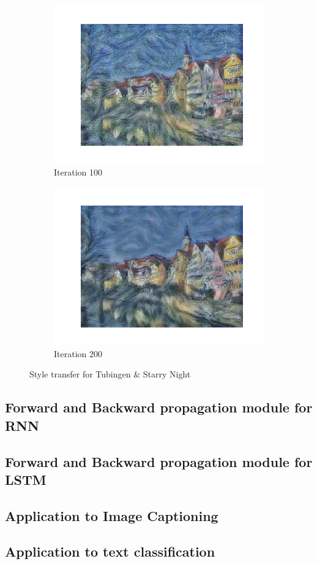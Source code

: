 \documentclass[12pt]{article}
\begin{document}
\begin{figure}[htbp]
\begin{subfigure}[t]{0.48\textwidth}
        \centering
        \includegraphics[trim={3in 0in 3in 0in},scale=0.45]{./Homework2/output/hw2p2_fig11.png}
        \caption{Iteration 100}
    \label{hw2p2k}
    \end{subfigure}
    \begin{subfigure}[t]{0.48\textwidth}
        \centering
        \includegraphics[trim={3in 0in 3in 0in},scale=0.7]{./Homework2/output/hw2p2_fig12.png}
        \caption{Iteration 200}
    \label{hw2p2l}
    \end{subfigure}
    \caption{Style transfer for Tubingen \& Starry Night}
\end{figure}

\subsection{Forward and Backward propagation module for RNN}
\subsection{Forward and Backward propagation module for LSTM}
\subsection{Application to Image Captioning}
\subsection{Application to text classification}
\end{document}
